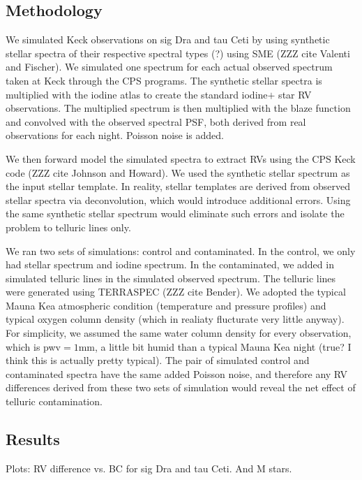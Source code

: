 \documentclass{emulateapj}
\begin{document}
\begin{CJK*}{UTF8}{gbsn}
\subsection{Methodology}

We simulated Keck observations on sig Dra and tau Ceti by using
synthetic stellar spectra of their respective spectral types (?) using
SME (ZZZ cite Valenti and Fischer). We simulated one spectrum for each
actual observed spectrum taken at Keck through the CPS programs. The
synthetic stellar spectra is multiplied with the iodine atlas to
create the standard iodine$+$ star RV observations. The multiplied
spectrum is then multiplied with the blaze function and convolved with
the observed spectral PSF, both derived from real observations for
each night. Poisson noise is added.

We then forward model the simulated spectra to extract RVs using the
CPS Keck code (ZZZ cite Johnson and Howard). We used the synthetic
stellar spectrum as the input stellar template. In reality, stellar
templates are derived from observed stellar spectra via deconvolution,
which would introduce additional errors. Using the same synthetic
stellar spectrum would eliminate such errors and isolate the problem
to telluric lines only.

We ran two sets of simulations: control and contaminated. In the
control, we only had stellar spectrum and iodine spectrum. In the
contaminated, we added in simulated telluric lines in the simulated
observed spectrum. The telluric lines were generated using TERRASPEC
(ZZZ cite Bender). We adopted the typical Mauna Kea atmospheric
condition (temperature and pressure profiles) and typical oxygen
column density (which in realiaty flucturate very little anyway). For
simplicity, we assumed the same water column density for every
observation, which is pwv$=1$mm, a little bit humid than a typical
Mauna Kea night (true? I think this is actually pretty typical). The
pair of simulated control and contaminated spectra have the same added
Poisson noise, and therefore any RV differences derived from these two
sets of simulation would reveal the net effect of telluric
contamination.


\subsection{Results}

Plots: RV difference vs. BC for sig Dra and tau Ceti. And M stars.


\end{CJK*}
\end{document}

